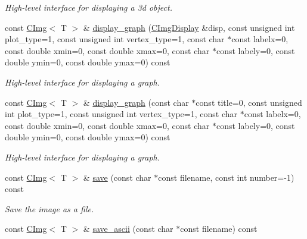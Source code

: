\begin{DoxyCompactItemize}
\begin{DoxyCompactList}\small\item\em High-\/level interface for displaying a 3d object. \item\end{DoxyCompactList}\item 
\hypertarget{structcimg__library_1_1CImg_acacf5a4ef4f35c7a396dc7759928c30b}{
const \hyperlink{structcimg__library_1_1CImg}{CImg}$<$ T $>$ \& \hyperlink{structcimg__library_1_1CImg_acacf5a4ef4f35c7a396dc7759928c30b}{display\_\-graph} (\hyperlink{structcimg__library_1_1CImgDisplay}{CImgDisplay} \&disp, const unsigned int plot\_\-type=1, const unsigned int vertex\_\-type=1, const char $\ast$const labelx=0, const double xmin=0, const double xmax=0, const char $\ast$const labely=0, const double ymin=0, const double ymax=0) const }
\label{structcimg__library_1_1CImg_acacf5a4ef4f35c7a396dc7759928c30b}

\begin{DoxyCompactList}\small\item\em High-\/level interface for displaying a graph. \item\end{DoxyCompactList}\item 
\hypertarget{structcimg__library_1_1CImg_a97baf05869f5a0cc24b3f7c2375570bb}{
const \hyperlink{structcimg__library_1_1CImg}{CImg}$<$ T $>$ \& \hyperlink{structcimg__library_1_1CImg_a97baf05869f5a0cc24b3f7c2375570bb}{display\_\-graph} (const char $\ast$const title=0, const unsigned int plot\_\-type=1, const unsigned int vertex\_\-type=1, const char $\ast$const labelx=0, const double xmin=0, const double xmax=0, const char $\ast$const labely=0, const double ymin=0, const double ymax=0) const }
\label{structcimg__library_1_1CImg_a97baf05869f5a0cc24b3f7c2375570bb}

\begin{DoxyCompactList}\small\item\em High-\/level interface for displaying a graph. \item\end{DoxyCompactList}\item 
const \hyperlink{structcimg__library_1_1CImg}{CImg}$<$ T $>$ \& \hyperlink{structcimg__library_1_1CImg_a4fd91f4fb021d20c5b62329c49733bd9}{save} (const char $\ast$const filename, const int number=-\/1) const 
\begin{DoxyCompactList}\small\item\em Save the image as a file. \item\end{DoxyCompactList}\item 
\hypertarget{structcimg__library_1_1CImg_a6039799358c3fe91fe6e828d3433db2f}{
const \hyperlink{structcimg__library_1_1CImg}{CImg}$<$ T $>$ \& \hyperlink{structcimg__library_1_1CImg_a6039799358c3fe91fe6e828d3433db2f}{save\_\-ascii} (const char $\ast$const filename) const }
\label{structcimg__library_1_1CImg_a6039799358c3fe91fe6e828d3433db2f}


\end{DoxyCompactItemize}

